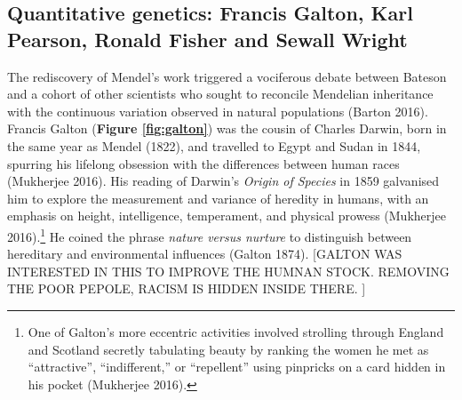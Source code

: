 \documentclass[
]{book}
\begin{document}
\hypertarget{quantitative-genetics-francis-galton-karl-pearson-ronald-fisher-and-sewall-wright}{%
\subsection{Quantitative genetics: Francis Galton, Karl Pearson, Ronald Fisher and Sewall Wright}\label{quantitative-genetics-francis-galton-karl-pearson-ronald-fisher-and-sewall-wright}}

The rediscovery of Mendel's work triggered a vociferous debate between Bateson and a cohort of other scientists who sought to reconcile Mendelian inheritance with the continuous variation observed in natural populations (Barton 2016). Francis Galton (\textbf{Figure \ref{fig:galton}}) was the cousin of Charles Darwin, born in the same year as Mendel (1822), and travelled to Egypt and Sudan in 1844, spurring his lifelong obsession with the differences between human races (Mukherjee 2016). His reading of Darwin's \emph{Origin of Species} in 1859 galvanised him to explore the measurement and variance of heredity in humans, with an emphasis on height, intelligence, temperament, and physical prowess (Mukherjee 2016).\footnote{One of Galton's more eccentric activities involved strolling through England and Scotland secretly tabulating beauty by ranking the women he met as ``attractive'', ``indifferent,'' or ``repellent'' using pinpricks on a card hidden in his pocket (Mukherjee 2016).} He coined the phrase \emph{nature versus nurture} to distinguish between hereditary and environmental influences (Galton 1874). {[}GALTON WAS INTERESTED IN THIS TO IMPROVE THE HUMNAN STOCK. REMOVING THE POOR PEPOLE, RACISM IS HIDDEN INSIDE THERE. {]}
\end{document}
